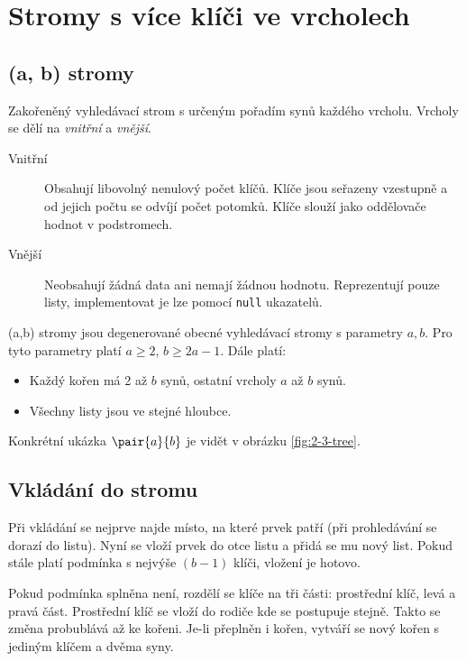 \section{Stromy s více klíči ve vrcholech}

\subsection{(a, b) stromy}

Zakořeněný vyhledávací strom s určeným pořadím synů každého vrcholu.
Vrcholy se dělí na \textit{vnitřní} a \textit{vnější}.

\begin{description}
    \item[Vnitřní] Obsahují libovolný nenulový počet klíčů.
    Klíče jsou seřazeny vzestupně a od jejich počtu se odvíjí počet potomků.
    Klíče slouží jako oddělovače hodnot v podstromech.
    \item[Vnější] Neobsahují žádná data ani nemají žádnou hodnotu.
    Reprezentují pouze listy, implementovat je lze pomocí \texttt{null} ukazatelů.
\end{description}

(a,b) stromy jsou degenerované obecné vyhledávací stromy s parametry $a, b$.
Pro tyto parametry platí $a \geq 2$, $b \geq 2a - 1$.
Dále platí:

\begin{itemize}
    \item Každý kořen má 2 až $b$ synů, ostatní vrcholy $a$ až $b$ synů.
    \item Všechny listy jsou ve stejné hloubce.
\end{itemize}

Konkrétní ukázka $\pair{a}{b}$ je vidět v obrázku \ref{fig:2-3-tree}.



\subsection{Vkládání do stromu}

Při vkládání se nejprve najde místo, na které prvek patří (při prohledávání se dorazí do listu).
Nyní se vloží prvek do otce listu a přidá se mu nový list.
Pokud stále platí podmínka s nejvýše $(b-1)$ klíči, vložení je hotovo.

Pokud podmínka splněna není, rozdělí se klíče na tři části: prostřední klíč, levá a pravá část.
Prostřední klíč se vloží do rodiče kde se postupuje stejně.
Takto se změna probublává až ke kořeni.
Je-li přeplněn i kořen, vytváří se nový kořen s jediným klíčem a dvěma syny.

